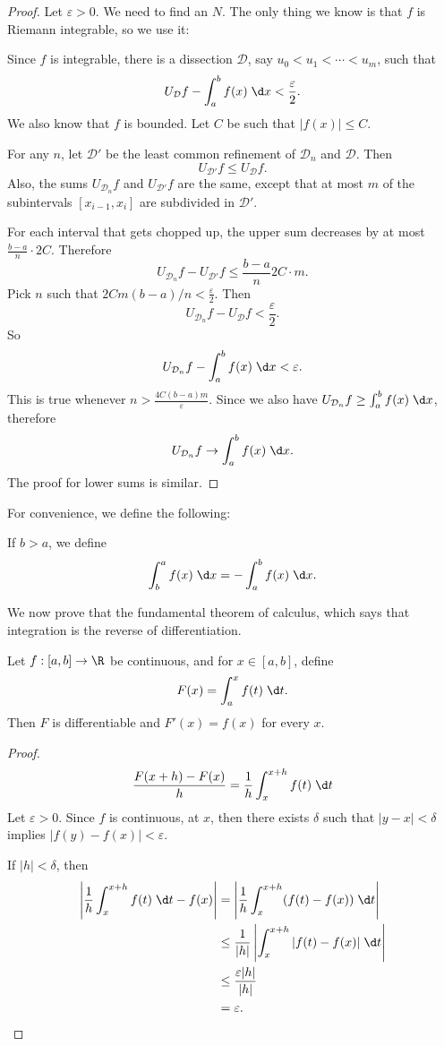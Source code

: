 \documentclass[a4paper]{article}
\begin{document}
\begin{proof}
  Let $\varepsilon > 0$. We need to find an $N$. The only thing we know is that $f$ is Riemann integrable, so we use it:

  Since $f$ is integrable, there is a dissection $\mathcal{D}$, say $u_0 < u_1 < \cdots < u_m$, such that
  \[
    U_\mathcal{D} f - \int_a^b f(x)\;\d x < \frac{\varepsilon}{2}.
  \]
  We also know that $f$ is bounded. Let $C$ be such that $|f(x)| \leq C$.

  For any $n$, let $\mathcal{D}'$ be the least common refinement of $\mathcal{D}_n$ and $\mathcal{D}$. Then
  \[
    U_{\mathcal{D}'}f \leq U_\mathcal{D} f.
  \]
  Also, the sums $U_{\mathcal{D}_n}f$ and $U_\mathcal{D'}f$ are the same, except that at most $m$ of the subintervals $[x_{i - 1}, x_i]$ are subdivided in $\mathcal{D}'$.

  For each interval that gets chopped up, the upper sum decreases by at most $\frac{b - a}{n}\cdot 2C$. Therefore
  \[
    U_{\mathcal{D}_n}f - U_{\mathcal{D}'}f \leq \frac{b - a}{n}2C\cdot m.
  \]
  Pick $n$ such that $2Cm(b - a)/n < \frac{\varepsilon}{2}$. Then
  \[
    U_{\mathcal{D}_n} f - U_\mathcal{D}f < \frac{\varepsilon}{2}.
  \]
  So
  \[
    U_{\mathcal{D}_n}f - \int_a^b f(x)\;\d x < \varepsilon.
  \]
  This is true whenever $n > \frac{4C(b - a)m}{\varepsilon}$. Since we also have $U_{\mathcal{D}_n} f \geq \int_a^b f(x)\;\d x$, therefore
  \[
    U_{\mathcal{D}_n}f \to \int_a^b f(x)\;\d x.
  \]
  The proof for lower sums is similar.
\end{proof}

For convenience, we define the following:
\begin{notation}
  If $b > a$, we define
  \[
    \int_b^a f(x)\;\d x = -\int_a^b f(x)\;\d x.
  \]
\end{notation}

We now prove that the fundamental theorem of calculus, which says that integration is the reverse of differentiation.
\begin{thm}
  Let $f: [a, b]\to \R$ be continuous, and for $x\in [a, b]$, define
  \[
    F(x) = \int_a^x f(t)\;\d t.
  \]
  Then $F$ is differentiable and $F'(x) = f(x)$ for every $x$.
\end{thm}

\begin{proof}
  \[
    \frac{F(x + h) - F(x)}{h} = \frac{1}{h}\int_x^{x + h}f(t)\;\d t
  \]
  Let $\varepsilon > 0$. Since $f$ is continuous, at $x$, then there exists $\delta$ such that $|y - x| < \delta$ implies $|f(y) - f(x)| < \varepsilon$.

  If $|h| < \delta$, then
  \begin{align*}
    \left|\frac{1}{h}\int_x^{x + h}f(t) \;\d t - f(x)\right| &= \left|\frac{1}{h}\int_x^{x + h}(f(t) - f(x))\;\d t\right|\\
    &\leq \frac{1}{|h|}\left|\int_x^{x + h}|f(t) - f(x)|\;\d t\right|\\
    &\leq \frac{\varepsilon|h|}{|h|}\\
    &= \varepsilon.\qedhere
  \end{align*}
\end{proof}
\end{document}
